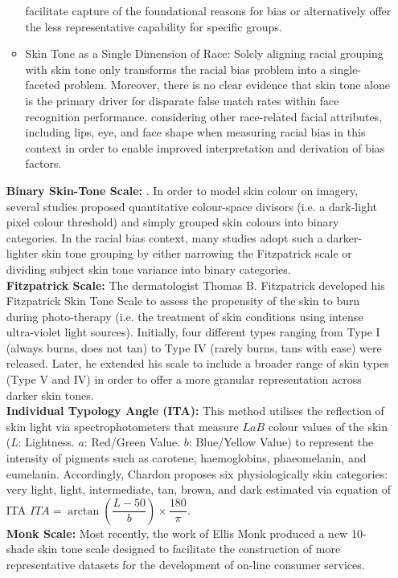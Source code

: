 \documentclass[12pt]{article}
\begin{document}
\begin{itemize}
\begin{itemize}
    facilitate capture of the foundational reasons for bias or alternatively offer the less representative capability for specific
    groups.
    \item Skin Tone as a Single Dimension of Race:  Solely aligning racial grouping with skin tone only transforms the racial
    bias problem into a single-faceted problem. Moreover, there is no clear evidence that skin tone alone is the primary
    driver for disparate false match rates within face recognition performance. considering other race-related facial attributes, including lips, eye, and face shape when measuring racial bias in this context in order to enable improved interpretation and derivation of bias factors.
  \end{itemize}
  \textbf{Binary Skin-Tone Scale:} . In order to model skin colour on imagery,
  several studies proposed quantitative colour-space divisors (i.e. a dark-light pixel colour threshold) and simply
  grouped skin colours into binary categories. In the racial bias context, many studies adopt such a darker-lighter skin tone
  grouping by either narrowing the Fitzpatrick scale or dividing subject skin tone variance into binary categories.\\
  \textbf{Fitzpatrick Scale:} The dermatologist Thomas B. Fitzpatrick developed his Fitzpatrick Skin Tone
  Scale to assess the propensity of the skin to burn during photo-therapy (i.e. the treatment of skin conditions using
  intense ultra-violet light sources). Initially, four different types ranging from Type I (always burns, does not tan) to
  Type IV (rarely burns, tans with ease) were released. Later, he extended his scale to include a broader range
  of skin types (Type V and IV) in order to offer a more granular representation across darker skin tones.\\
  \textbf{Individual Typology Angle (ITA):} This method utilises the reflection of skin light via spectrophotometers
  that measure $LaB$ colour values of the skin ($L$: Lightness. $a$: Red/Green Value. $b$: Blue/Yellow Value) to represent the
  intensity of pigments such as carotene, haemoglobins, phaeomelanin, and eumelanin. Accordingly, Chardon proposes
  six physiologically skin categories: {very light, light, intermediate, tan, brown, and dark} estimated via equation of ITA
  $ITA = \arctan\left(\dfrac{L-50}{b}\right) \times \dfrac{180}{\pi}$.\\
  \textbf{Monk Scale:} Most recently, the work of Ellis Monk produced a new 10-shade skin tone
  scale designed to facilitate the construction of more representative datasets for the development of on-line consumer services. 

\end{itemize}
\end{document}
